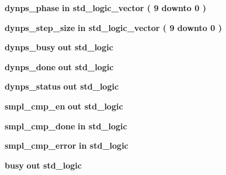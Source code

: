 \begin{DoxyCompactItemize}
\item 
{\bf dynps\+\_\+phase}  {\bfseries {\bfseries \textcolor{keywordflow}{in}\textcolor{vhdlchar}{ }}} {\bfseries \textcolor{comment}{std\+\_\+logic\+\_\+vector}\textcolor{vhdlchar}{ }\textcolor{vhdlchar}{(}\textcolor{vhdlchar}{ }\textcolor{vhdlchar}{ } \textcolor{vhdldigit}{9} \textcolor{vhdlchar}{ }\textcolor{keywordflow}{downto}\textcolor{vhdlchar}{ }\textcolor{vhdlchar}{ } \textcolor{vhdldigit}{0} \textcolor{vhdlchar}{ }\textcolor{vhdlchar}{)}\textcolor{vhdlchar}{ }} 
\item 
{\bf dynps\+\_\+step\+\_\+size}  {\bfseries {\bfseries \textcolor{keywordflow}{in}\textcolor{vhdlchar}{ }}} {\bfseries \textcolor{comment}{std\+\_\+logic\+\_\+vector}\textcolor{vhdlchar}{ }\textcolor{vhdlchar}{(}\textcolor{vhdlchar}{ }\textcolor{vhdlchar}{ } \textcolor{vhdldigit}{9} \textcolor{vhdlchar}{ }\textcolor{keywordflow}{downto}\textcolor{vhdlchar}{ }\textcolor{vhdlchar}{ } \textcolor{vhdldigit}{0} \textcolor{vhdlchar}{ }\textcolor{vhdlchar}{)}\textcolor{vhdlchar}{ }} 
\item 
{\bf dynps\+\_\+busy}  {\bfseries {\bfseries \textcolor{keywordflow}{out}\textcolor{vhdlchar}{ }}} {\bfseries \textcolor{comment}{std\+\_\+logic}\textcolor{vhdlchar}{ }} 
\item 
{\bf dynps\+\_\+done}  {\bfseries {\bfseries \textcolor{keywordflow}{out}\textcolor{vhdlchar}{ }}} {\bfseries \textcolor{comment}{std\+\_\+logic}\textcolor{vhdlchar}{ }} 
\item 
{\bf dynps\+\_\+status}  {\bfseries {\bfseries \textcolor{keywordflow}{out}\textcolor{vhdlchar}{ }}} {\bfseries \textcolor{comment}{std\+\_\+logic}\textcolor{vhdlchar}{ }} 
\item 
{\bf smpl\+\_\+cmp\+\_\+en}  {\bfseries {\bfseries \textcolor{keywordflow}{out}\textcolor{vhdlchar}{ }}} {\bfseries \textcolor{comment}{std\+\_\+logic}\textcolor{vhdlchar}{ }} 
\item 
{\bf smpl\+\_\+cmp\+\_\+done}  {\bfseries {\bfseries \textcolor{keywordflow}{in}\textcolor{vhdlchar}{ }}} {\bfseries \textcolor{comment}{std\+\_\+logic}\textcolor{vhdlchar}{ }} 
\item 
{\bf smpl\+\_\+cmp\+\_\+error}  {\bfseries {\bfseries \textcolor{keywordflow}{in}\textcolor{vhdlchar}{ }}} {\bfseries \textcolor{comment}{std\+\_\+logic}\textcolor{vhdlchar}{ }} 
\item 
{\bf busy}  {\bfseries {\bfseries \textcolor{keywordflow}{out}\textcolor{vhdlchar}{ }}} {\bfseries \textcolor{comment}{std\+\_\+logic}\textcolor{vhdlchar}{ }} 
\end{DoxyCompactItemize}


